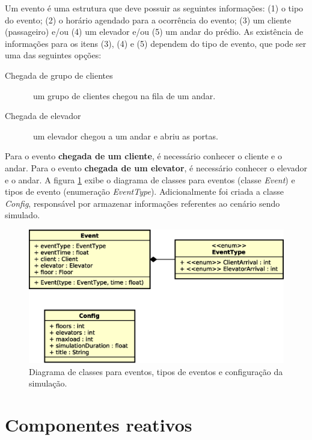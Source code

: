 Um evento é uma estrutura que deve possuir as seguintes informações: (1) o tipo
do evento; (2) o horário agendado para a ocorrência do evento; (3) um cliente
(passageiro) e/ou (4) um elevador e/ou (5) um andar do prédio. As existência de
informações para os itens (3), (4) e (5) dependem do tipo de evento, que pode
ser uma das seguintes opções:

\begin{description}
  \item[Chegada de grupo de clientes] \hfill \ um grupo de clientes chegou na fila de um andar.
  \item[Chegada de elevador] \hfill \ um elevador chegou a um andar e abriu as portas.
\end{description}

Para o evento \textbf{chegada de um cliente}, é necessário conhecer o cliente e
o andar. Para o evento \textbf{chegada de um elevator}, é necessário conhecer o
elevador e o andar. A figura \ref{fig:diagram:event} exibe o diagrama de classes
para eventos (classe \textit{Event}) e tipos de evento (enumeração
\textit{EventType}). Adicionalmente foi criada a classe \textit{Config},
responsável por armazenar informações referentes ao cenário sendo simulado.

\begin{figure}[htb!]
  \centering
  \includegraphics[scale=0.6]{img/Basic.eps}
  \caption[Diagrama de classes para eventos, tipos e configuração]{Diagrama de classes para eventos, tipos de eventos e configuração da simulação.}
\label{fig:diagram:event}
\end{figure}

\section{\label{sec:reactive}Componentes reativos}

